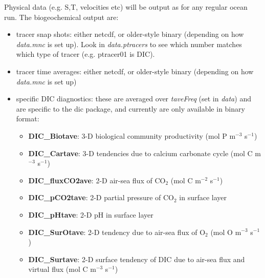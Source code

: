 Physical data (e.g. S,T, velocities etc) will be output as for any
regular ocean run. The biogeochemical output are:
\begin{itemize}
\item tracer snap shots: either netcdf, or older-style binary
  (depending on how {\it data.mnc} is set up). Look in {\it
    data.ptracers} to see which number matches which type of tracer
  (e.g. ptracer01 is DIC).
\item tracer time averages: either netcdf, or older-style binary
  (depending on how {\it data.mnc} is set up)
\item specific DIC diagnostics: these are averaged over {\it taveFreq}
  (set in {\it data}) and are specific to the dic package, and
  currently are only available in binary format:
  \begin{itemize}
  \item{\bf DIC\_Biotave}: 3-D biological community productivity (mol
    P m$^{-3}$ s$^{-1}$)
  \item{\bf DIC\_Cartave}: 3-D tendencies due to calcium carbonate
    cycle (mol C m$^{-3}$ s$^{-1}$)
  \item{\bf DIC\_fluxCO2ave}: 2-D air-sea flux of CO$_2$ (mol C
    m$^{-2}$ s$^{-1}$)
  \item{\bf DIC\_pCO2tave}: 2-D partial pressure of CO$_2$ in surface
    layer
  \item{\bf DIC\_pHtave}: 2-D pH in surface layer
  \item{\bf DIC\_SurOtave}: 2-D tendency due to air-sea flux of O$_2$
    (mol O m$^{-3}$ s$^{-1}$)
  \item{\bf DIC\_Surtave}: 2-D surface tendency of DIC due to air-sea
    flux and virtual flux (mol C m$^{-3}$ s$^{-1}$)
  \end{itemize}
\end{itemize}



